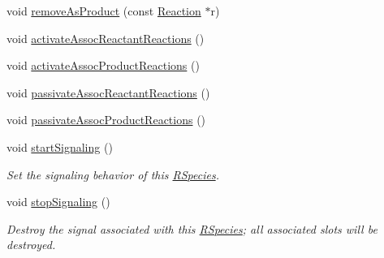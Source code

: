 \begin{DoxyCompactItemize}
\item 
void \hyperlink{classchem_1_1RSpecies_a423e5852f749ab65553c48ed0239c243}{remove\-As\-Product} (const \hyperlink{classchem_1_1Reaction}{Reaction} $\ast$r)
\item 
void \hyperlink{classchem_1_1RSpecies_a1589cd0e045a084a32dff4a02612d4a3}{activate\-Assoc\-Reactant\-Reactions} ()
\item 
void \hyperlink{classchem_1_1RSpecies_ab275b0c9fb9352abe35a3bd68f3917fb}{activate\-Assoc\-Product\-Reactions} ()
\item 
void \hyperlink{classchem_1_1RSpecies_a0c33c29f86ee16b84151bc5f38953076}{passivate\-Assoc\-Reactant\-Reactions} ()
\item 
void \hyperlink{classchem_1_1RSpecies_aff8862396958db832848c94135282f1e}{passivate\-Assoc\-Product\-Reactions} ()
\item 
void \hyperlink{classchem_1_1RSpecies_a0beefdc1ec28646df87b0690a2d66734}{start\-Signaling} ()
\begin{DoxyCompactList}\small\item\em Set the signaling behavior of this \hyperlink{classchem_1_1RSpecies}{R\-Species}. \end{DoxyCompactList}\item 
void \hyperlink{classchem_1_1RSpecies_a3519759c28c5d50108753ebe6c67a537}{stop\-Signaling} ()
\begin{DoxyCompactList}\small\item\em Destroy the signal associated with this \hyperlink{classchem_1_1RSpecies}{R\-Species}; all associated slots will be destroyed. \end{DoxyCompactList}\end{DoxyCompactItemize}
